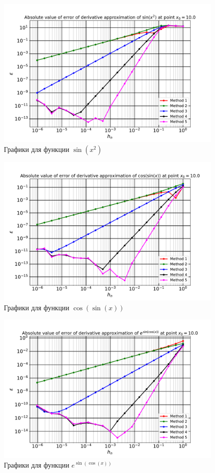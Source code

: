 		\begin{figure}[h!]
			\centering
			\includegraphics[width=\linewidth]{./Pictures/Function_1.pdf}
			\caption{Графики для функции $\sin(x^2)$}
		\end{figure}
	
		\newpage
		\begin{figure}[h!]
			\centering
			\includegraphics[width=\linewidth]{./Pictures/Function_2.pdf}
			\caption{Графики для функции $\cos(\sin(x))$}
		\end{figure}
	
		\begin{figure}[h!]
			\centering
			\includegraphics[width=\linewidth]{./Pictures/Function_3.pdf}
			\caption{Графики для функции $e^{\sin(\cos(x))}$}
		\end{figure}
	
